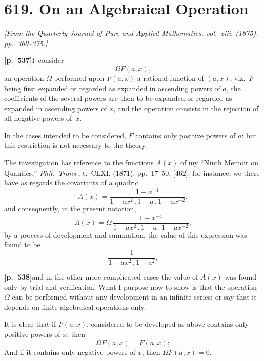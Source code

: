 \documentclass[11pt,a4paper]{article}
\begin{document}
\bigskip

\section*{\textbf{619.} On an Algebraical Operation}

\textit{[From the Quarterly Journal of Pure and Applied Mathematics, vol.~xiii. (1875), pp.~369--375.]}

\bigskip

\noindent\textbf{[p.~537]}\quad I~consider
\[
\Omega F(a, x),
\]
an operation $\Omega$ performed upon $F(a, x)$ a rational function of $(a, x)$; viz.\ $F$ being first expanded or regarded as expanded in ascending powers of $a$, the coefficients of the several powers are then to be expanded or regarded as expanded in ascending powers of $x$, and the operation consists in the rejection of all negative powers of~$x$.

In the cases intended to be considered, $F$ contains only positive powers of $a$: but this restriction is not necessary to the theory.

The investigation has reference to the functions $A(x)$ of my ``Ninth Memoir on Quantics,'' \textit{Phil.\ Trans.}, t.~CLXI. (1871), pp.~17--50, [462]; for instance, we there have as regards the covariants of a quadric
\[
A(x) = \frac{1 - x^{-4}}{1 - a x^{2}\,.\,1 - a\,.\,1 - a x^{-2}},
\]
and consequently, in the present notation,
\[
A(x) = \Omega\,\frac{1 - x^{-4}}{1 - a x^{2}\,.\,1 - a\,.\,1 - a x^{-2}};
\]
by a process of development and summation, the value of this expression was found to be
\[
\frac{1}{1 - a x^{2}\,.\,1 - a^{2}},
\]

\bigskip

\noindent\textbf{[p.~538]}\quad and in the other more complicated cases the value of $A(x)$ was found only by trial and verification. What I purpose now to show is that the operation $\Omega$ can be performed without any development in an infinite series; or say that it depends on finite algebraical operations only.

It is clear that if $F(a, x)$, considered to be developed as above contains only positive powers of $x$, then
\[
\Omega F(a, x) = F(a, x);
\]
And if it contains only negative powers of $x$, then $\Omega F(a, x) = 0$.
\end{document}
